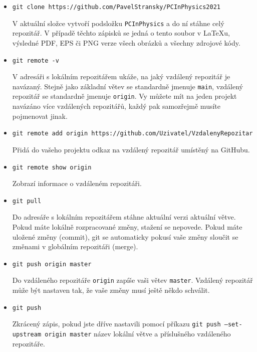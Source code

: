 \documentclass[a4paper,11pt,twoside]{article}
\def\code#1{\textnormal{\texttt{#1}}}
\theoremstyle{red}
\theoremstyle{green}
\begin{document}
    \begin{itemize}
    \item \code{git clone https://github.com/PavelStransky/PCInPhysics2021}
    
        V aktuální složce vytvoří podsložku \code{PCInPhysics} a do ní stáhne celý repozitář.
        V případě těchto zápisků se jedná o tento soubor v {\LaTeX}u,
        výsledné PDF, EPS či PNG verze všech obrázků a všechny zdrojové kódy.

    \item \code{git remote -v}
    
        V adresáři s lokálním repozitářem ukáže, na jaký vzdálený repozitář je navázaný.
        Stejně jako základní větev se standardně jmenuje \code{main}, vzdálený repozitář se standardně jmenuje \code{origin}.
        Vy můžete mít na jeden projekt navázáno více vzdálených repozitářů, každý pak samozřejmě musíte pojmenovat jinak.

    \item \code{git remote add origin https://github.com/Uzivatel/VzdalenyRepozitar}
    
        Přidá do vašeho projektu odkaz na vzdálený repozitář umístěný na GitHubu.

    \item \code{git remote show origin}
    
        Zobrazí informace o vzdáleném repozitáři.

    \item \code{git pull}
    
        Do adresáře s lokálním repozitářem stáhne aktuální verzi aktuální větve.
        Pokud máte lokálně rozpracované změny, stažení se nepovede.
        Pokud máte uložené změny (commit), git se automaticky pokusí vaše změny sloučit se změnami v globálním repozitáři (merge).
        
    \item \code{git push origin master}
    
        Do vzdáleného repozitáře \code{origin} zapíše vaši větev \code{master}.
        Vzdálený repozitář může být nastaven tak, že vaše změny musí ještě někdo schválit.

    \item \code{git push}

        Zkrácený zápis, pokud jste dříve nastavili pomocí příkazu \code{git push --set-upstream origin master} název lokální větve a příslušného vzdáleného repozitáře.

    \end{itemize}
\end{document}
